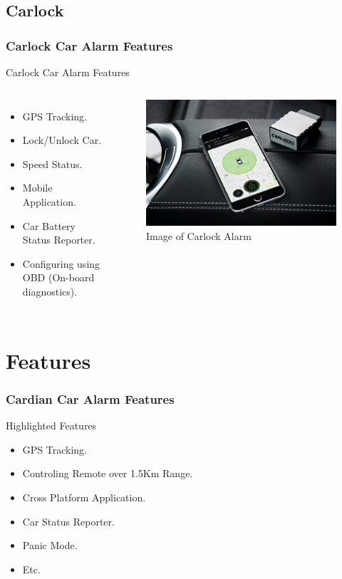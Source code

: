 \documentclass[aspectratio=169,11pt]{beamer}
\begin{document}
	\subsection{Carlock}
	\begin{frame}
		\frametitle{Carlock Car Alarm Features}
		\begin{block}{Carlock Car Alarm Features}
			\begin{columns}[c]
				\begin{itemize}
					\item GPS Tracking.
					\item Lock/Unlock Car.
					\item Speed Status.
					\item Mobile Application.
					\item Car Battery Status Reporter.
					\item Configuring using OBD (On-board diagnostics).
				\end{itemize}
				\begin{figure}[!h]
					\centering
					\includegraphics[width=\textwidth]{../latex/images/carlock-main-module.jpeg}
					\caption{Image of Carlock Alarm}
				\end{figure}
			\end{columns}
		\end{block}
	\end{frame}

	\section{Features}
	\begin{frame}
		\frametitle{Cardian Car Alarm Features}
		\begin{block}{Highlighted Features}
			\begin{itemize}
				\item GPS Tracking.
				\item Controling Remote over 1.5Km Range.
				\item Cross Platform Application.
				\item Car Status Reporter.
				\item Panic Mode.
				\item Etc.
			\end{itemize}
		\end{block}
	\end{frame}
\end{document}
